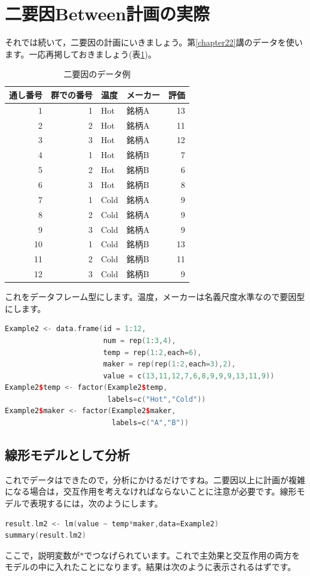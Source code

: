 \documentclass{ltjsarticle}
\begin{document}
\section{二要因Between計画の実際}
それでは続いて，二要因の計画にいきましょう。第\ref{chapter22}講のデータを使います。一応再掲しておきましょう(表\ref{tbl::23_02})。
\begin{table}[ht]
  \centering
  \caption{二要因のデータ例} 
  \begin{tabular}{rrllr}
    \hline
  通し番号 & 群での番号 & 温度 & メーカー & 評価 \\ 
    \hline
  1 & 1 & Hot & 銘柄A & 13 \\ 
    2 & 2 & Hot & 銘柄A & 11 \\ 
    3 & 3 & Hot & 銘柄A & 12 \\ 
    4 & 1 & Hot & 銘柄B & 7 \\ 
    5 & 2 & Hot & 銘柄B & 6 \\ 
    6 & 3 & Hot & 銘柄B & 8 \\ 
    7 & 1 & Cold & 銘柄A & 9 \\ 
    8 & 2 & Cold & 銘柄A & 9 \\ 
    9 & 3 & Cold & 銘柄A & 9 \\ 
    10 & 1 & Cold & 銘柄B & 13 \\ 
    11 & 2 & Cold & 銘柄B & 11 \\ 
    12 & 3 & Cold & 銘柄B & 9 \\ 
     \hline
  \end{tabular}

  \label{tbl::23_02}
  \end{table}
これをデータフレーム型にします。温度，メーカーは名義尺度水準なので要因型にします。
\begin{lstlisting}[language=c++]
Example2 <- data.frame(id = 1:12,
                       num = rep(1:3,4),
                       temp = rep(1:2,each=6),
                       maker = rep(rep(1:2,each=3),2),
                       value = c(13,11,12,7,6,8,9,9,9,13,11,9))
Example2$temp <- factor(Example2$temp,
                        labels=c("Hot","Cold"))
Example2$maker <- factor(Example2$maker,
                         labels=c("A","B"))
\end{lstlisting}
\subsection{線形モデルとして分析}
これでデータはできたので，分析にかけるだけですね。二要因以上に計画が複雑になる場合は，交互作用を考えなければならないことに注意が必要です。線形モデルで表現するには，次のようにします。
\begin{lstlisting}[language=c++]
result.lm2 <- lm(value ~ temp*maker,data=Example2)
summary(result.lm2)
\end{lstlisting}
ここで，説明変数が$\ast$でつなげられています。これで主効果と交互作用の両方をモデルの中に入れたことになります。結果は次のように表示されるはずです。
\end{document}
